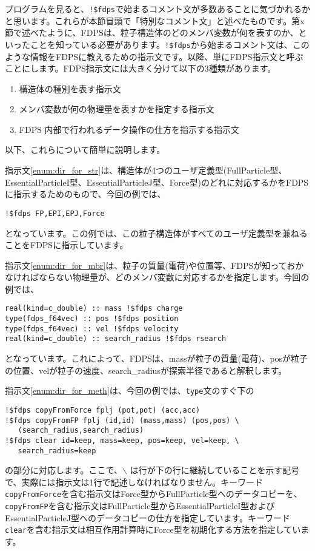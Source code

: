 \documentclass[twocolumn,10pt]{jarticle}
\begin{document}
プログラムを見ると、\texttt{!\$fdps}で始まるコメント文が多数あることに気づかれるかと思います。これらが本節冒頭で「特別なコメント文」と述べたものです。第x節で述べたように、FDPSは、粒子構造体のどのメンバ変数が何を表すのか、といったことを知っている必要があります。\texttt{!\$fdps}から始まるコメント文は、このような情報をFDPSに教えるための指示文です。以降、単にFDPS指示文と呼ぶことにします。FDPS指示文には大きく分けて以下の3種類があります。
\begin{enumerate}[label=(\alph*)]
\item 構造体の種別を表す指示文\label{enum:dir_for_str}
\item メンバ変数が何の物理量を表すかを指定する指示文\label{enum:dir_for_mbr}
\item FDPS 内部で行われるデータ操作の仕方を指示する指示文\label{enum:dir_for_meth}
\end{enumerate}
以下、これらについて簡単に説明します。

指示文\ref{enum:dir_for_str}は、構造体が4つのユーザ定義型(FullParticle型、EssentialParticleI型、EssentialParticleJ型、Force型)のどれに対応するかをFDPSに指示するためのもので、今回の例では、
{\footnotesize
\begin{verbatim}
!$fdps FP,EPI,EPJ,Force
\end{verbatim}
}\noindent
となっています。この例では、この粒子構造体がすべてのユーザ定義型を兼ねることをFDPSに指示しています。

指示文\ref{enum:dir_for_mbr}は、粒子の質量(電荷)や位置等、FDPSが知っておかなければならない物理量が、どのメンバ変数に対応するかを指定します。今回の例では、
{\footnotesize
\begin{verbatim}
real(kind=c_double) :: mass !$fdps charge
type(fdps_f64vec) :: pos !$fdps position
type(fdps_f64vec) :: vel !$fdps velocity
real(kind=c_double) :: search_radius !$fdps rsearch  
\end{verbatim}
}\noindent
となっています。これによって、FDPSは、massが粒子の質量(電荷)、posが粒子の位置、velが粒子の速度、search\_radiusが探索半径であると解釈します。

指示文\ref{enum:dir_for_meth}は、今回の例では、\texttt{type}文のすぐ下の
{\footnotesize
\begin{verbatim}
!$fdps copyFromForce fplj (pot,pot) (acc,acc)
!$fdps copyFromFP fplj (id,id) (mass,mass) (pos,pos) \
   (search_radius,search_radius)
!$fdps clear id=keep, mass=keep, pos=keep, vel=keep, \
   search_radius=keep
\end{verbatim}
}\noindent
の部分に対応します。ここで、$\backslash$ は行が下の行に継続していることを示す記号で、実際には指示文は1行で記述しなければなりません。キーワード\texttt{copyFromForce}を含む指示文はForce型からFullParticle型へのデータコピーを、\texttt{copyFromFP}を含む指示文はFullParticle型からEssentialParticleI型およびEssentialParticleJ型へのデータコピーの仕方を指定しています。キーワード\texttt{clear}を含む指示文は相互作用計算時にForce型を初期化する方法を指定しています。
\end{document}
